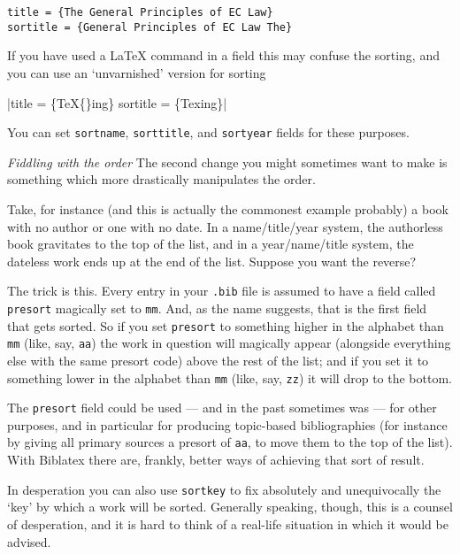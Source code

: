 \begin{verbatim}
title = {The General Principles of EC Law}
sortitle = {General Principles of EC Law The}
\end{verbatim}

  If you have used a LaTeX command in a field this may confuse the
  sorting, and you can use an `unvarnished' version for sorting

  |title = \{\TeX\{\}ing\} sortitle = \{Texing\}|

You can set \texttt{sortname}, \texttt{sorttitle}, and \texttt{sortyear}
fields for these purposes.

\emph{Fiddling with the order} The second change you might sometimes
want to make is something which more drastically manipulates the order.

Take, for instance (and this is actually the commonest example probably)
a book with no author or one with no date. In a name/title/year system,
the authorless book gravitates to the top of the list, and in a
year/name/title system, the dateless work ends up at the end of the
list. Suppose you want the reverse?

The trick is this. Every entry in your \texttt{.bib} file is assumed to
have a field called \texttt{presort} magically set to \texttt{mm}. And,
as the name suggests, that is the first field that gets sorted. So if
you set \texttt{presort} to something higher in the alphabet than
\texttt{mm} (like, say, \texttt{aa}) the work in question will magically
appear (alongside everything else with the same presort code) above the
rest of the list; and if you set it to something lower in the alphabet
than \texttt{mm} (like, say, \texttt{zz}) it will drop to the bottom.

The \texttt{presort} field could be used --- and in the past sometimes
was --- for other purposes, and in particular for producing topic-based
bibliographies (for instance by giving all primary sources a presort of
\texttt{aa}, to move them to the top of the list). With Biblatex there
are, frankly, better ways of achieving that sort of result.

In desperation you can also use \texttt{sortkey} to fix absolutely and
unequivocally the `key' by which a work will be sorted. Generally
speaking, though, this is a counsel of desperation, and it is hard to
think of a real-life situation in which it would be advised.




